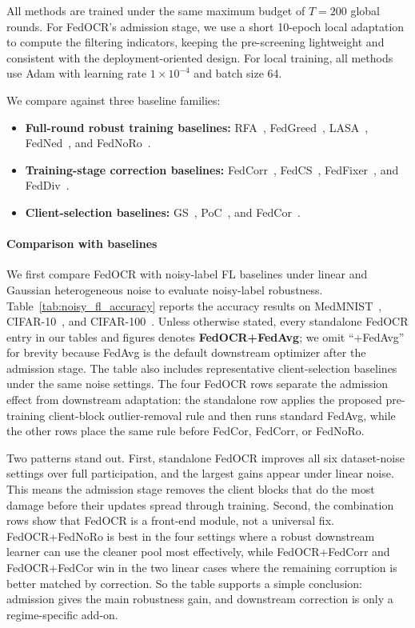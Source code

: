 ﻿\documentclass[conference]{IEEEtran}
\theoremstyle{definition}
\theoremstyle{remark}
\begin{document}
All methods are trained under the same maximum budget of $T=200$ global rounds. 
For FedOCR's admission stage, we use a short 10-epoch local adaptation to compute the filtering indicators, keeping the pre-screening lightweight and consistent with the deployment-oriented design. 
For local training, all methods use Adam with learning rate $1\times10^{-4}$ and batch size 64.

We compare against three baseline families:
\begin{itemize}
	\setlength{\itemsep}{0.1em}
	\setlength{\topsep}{0.15em}
	\setlength{\parsep}{0pt}
	\item \textbf{Full-round robust training baselines:} RFA~\cite{pillutla2022robust}, FedGreed~\cite{kritharakis2025fedgreed}, LASA~\cite{xu2025lasa}, FedNed~\cite{lu2024fedned}, and FedNoRo~\cite{wu2023fednoro}.
	\item \textbf{Training-stage correction baselines:} FedCorr~\cite{xu2022fedcorr}, FedCS~\cite{hao2025fedcs}, FedFixer~\cite{ji2024fedfixer}, and FedDiv~\cite{li2024feddiv}.
	\item \textbf{Client-selection baselines:} GS~\cite{ma2021client}, PoC~\cite{cho2022power}, and FedCor~\cite{tang2022fedcor}.
\end{itemize}

\paragraph{\textbf{Comparison with baselines}}
\label{para:comp_nfl}
We first compare FedOCR with noisy-label FL baselines under linear and Gaussian heterogeneous noise to evaluate noisy-label robustness.
Table~\ref{tab:noisy_fl_accuracy} reports the accuracy results on MedMNIST~\cite{yang2023medmnist}, CIFAR-10~\cite{krizhevsky2009learning}, and CIFAR-100~\cite{krizhevsky2009learning}.
Unless otherwise stated, every standalone FedOCR entry in our tables and figures denotes \textbf{FedOCR+FedAvg}; we omit ``+FedAvg'' for brevity because FedAvg is the default downstream optimizer after the admission stage.
The table also includes representative client-selection baselines under the same noise settings.
The four FedOCR rows separate the admission effect from downstream adaptation: the standalone row applies the proposed pre-training client-block outlier-removal rule and then runs standard FedAvg, while the other rows place the same rule before FedCor, FedCorr, or FedNoRo.

Two patterns stand out. First, standalone FedOCR improves all six dataset-noise settings over full participation, and the largest gains appear under linear noise. This means the admission stage removes the client blocks that do the most damage before their updates spread through training.
Second, the combination rows show that FedOCR is a front-end module, not a universal fix. FedOCR+FedNoRo is best in the four settings where a robust downstream learner can use the cleaner pool most effectively, while FedOCR+FedCorr and FedOCR+FedCor win in the two linear cases where the remaining corruption is better matched by correction.
So the table supports a simple conclusion: admission gives the main robustness gain, and downstream correction is only a regime-specific add-on.
\end{document}
